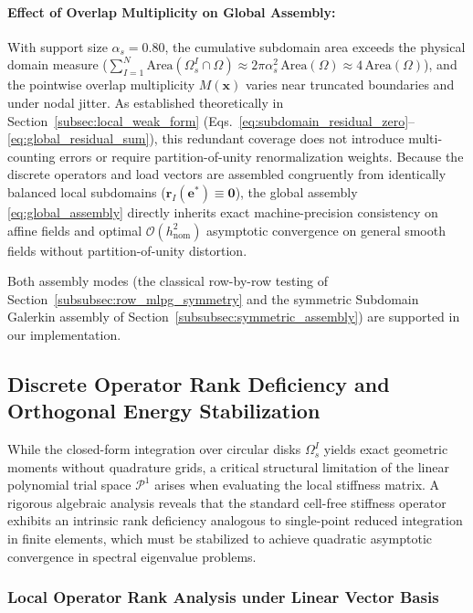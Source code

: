 \documentclass[VANCOUVER,Times1COL]{WileyNJD-v5}
\begin{document}
\paragraph{Effect of Overlap Multiplicity on Global Assembly:}
With support size $\alpha_s = 0.80$, the cumulative subdomain area exceeds the physical domain measure ($\sum_{I=1}^N \mathrm{Area}(\Omega_s^I \cap \Omega) \approx 2\pi \alpha_s^2 \, \mathrm{Area}(\Omega) \approx 4\,\mathrm{Area}(\Omega)$), and the pointwise overlap multiplicity $M(\mathbf{x})$ varies near truncated boundaries and under nodal jitter. As established theoretically in Section~\ref{subsec:local_weak_form} (Eqs.~\eqref{eq:subdomain_residual_zero}--\eqref{eq:global_residual_sum}), this redundant coverage does not introduce multi-counting errors or require partition-of-unity renormalization weights. Because the discrete operators and load vectors are assembled congruently from identically balanced local subdomains ($\mathbf{r}_I(\mathbf{e}^*) \equiv \mathbf{0}$), the global assembly \eqref{eq:global_assembly} directly inherits exact machine-precision consistency on affine fields and optimal $\mathcal{O}(h_{\mathrm{nom}}^2)$ asymptotic convergence on general smooth fields without partition-of-unity distortion.

Both assembly modes (the classical row-by-row testing of Section~\ref{subsubsec:row_mlpg_symmetry} and the symmetric Subdomain Galerkin assembly of Section~\ref{subsubsec:symmetric_assembly}) are supported in our implementation.

\subsection{Discrete Operator Rank Deficiency and Orthogonal Energy Stabilization}
\label{subsec:rank_deficiency_stabilization}

While the closed-form integration over circular disks $\Omega_s^I$ yields exact geometric moments without quadrature grids, a critical structural limitation of the linear polynomial trial space $\mathcal{P}^1$ arises when evaluating the local stiffness matrix. A rigorous algebraic analysis reveals that the standard cell-free stiffness operator exhibits an intrinsic rank deficiency analogous to single-point reduced integration in finite elements, which must be stabilized to achieve quadratic asymptotic convergence in spectral eigenvalue problems.

\subsubsection{Local Operator Rank Analysis under Linear Vector Basis}
\label{subsubsec:local_rank_analysis}
\end{document}
